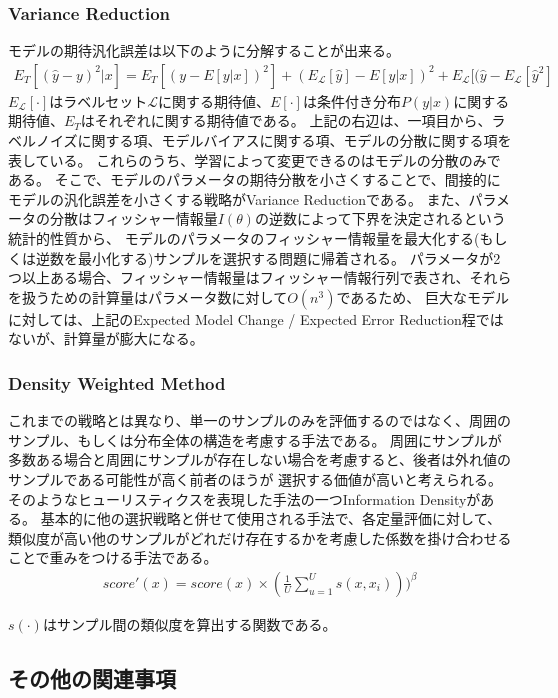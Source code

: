 \subsubsection{Variance Reduction}
モデルの期待汎化誤差は以下のように分解することが出来る。
\begin{eqnarray}
    E_T [(\hat{y} - y)^2|x] = E_T [(y - E[y|x])^2] + (E_{\mathcal{L}}[\hat{y}] - E[y|x])^2 + E_{\mathcal{L}} [(\hat{y} - E_{\mathcal{L}}[\hat{y}^2]
\end{eqnarray}
$E_{\mathcal{L}}[\cdot]$はラベルセット$\mathcal{L}$に関する期待値、$E[\cdot]$は条件付き分布$P(y|x)$に関する期待値、$E_T$はそれぞれに関する期待値である。
上記の右辺は、一項目から、ラベルノイズに関する項、モデルバイアスに関する項、モデルの分散に関する項を表している。
これらのうち、学習によって変更できるのはモデルの分散のみである。
そこで、モデルのパラメータの期待分散を小さくすることで、間接的にモデルの汎化誤差を小さくする戦略がVariance Reductionである。
また、パラメータの分散はフィッシャー情報量$I(\theta)$の逆数によって下界を決定されるという統計的性質から、
モデルのパラメータのフィッシャー情報量を最大化する(もしくは逆数を最小化する)サンプルを選択する問題に帰着される。
パラメータが2つ以上ある場合、フィッシャー情報量はフィッシャー情報行列で表され、それらを扱うための計算量はパラメータ数に対して$O(n^3)$であるため、
巨大なモデルに対しては、上記のExpected Model Change / Expected Error Reduction程ではないが、計算量が膨大になる。

\subsubsection{Density Weighted Method}
これまでの戦略とは異なり、単一のサンプルのみを評価するのではなく、周囲のサンプル、もしくは分布全体の構造を考慮する手法である。
周囲にサンプルが多数ある場合と周囲にサンプルが存在しない場合を考慮すると、後者は外れ値のサンプルである可能性が高く前者のほうが
選択する価値が高いと考えられる。
そのようなヒューリスティクスを表現した手法の一つInformation Densityがある。
基本的に他の選択戦略と併せて使用される手法で、各定量評価に対して、類似度が高い他のサンプルがどれだけ存在するかを考慮した係数を掛け合わせることで重みをつける手法である。
\begin{eqnarray}
    score'(x) = score(x) \times (\frac{1}{U} \sum_{u=1}^{U} s(x, x_i)))^{\beta}
\end{eqnarray}

$s(\cdot)$はサンプル間の類似度を算出する関数である。

\subsection{その他の関連事項}
